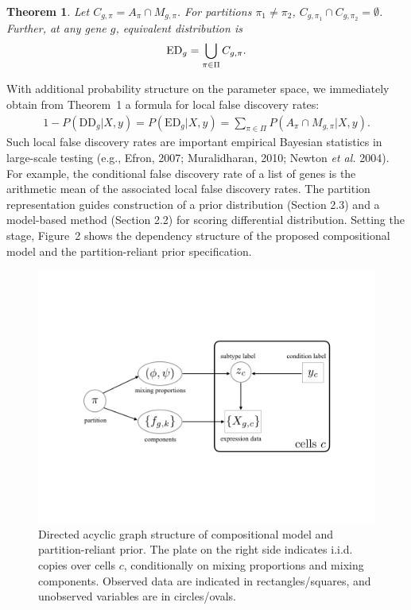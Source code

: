 \documentclass[aoas,preprint]{imsart}
\newtheorem{theorem}{Theorem}
\begin{document}
\begin{theorem}  Let $C_{g,\pi} = A_\pi\cap M_{g, \pi}$.  For 
partitions $\pi_1 \neq\pi_2$, \mbox{$C_{g,\pi_1} \cap C_{g,\pi_2} = \emptyset$}. Further,
 at any gene $g$, equivalent distribution is
\begin{eqnarray*}
{\rm{ED}}_g = \bigcup_{\pi \in \Pi} C_{g,\pi}.
\end{eqnarray*}
\end{theorem}
With additional 
probability structure on the parameter space,  we immediately obtain from Theorem~1 
a formula for local false discovery rates:
\begin{align}
\label{eq:lfdr}
1-P(\text{DD}_g|X,y) = 
 P(\text{ED}_g|X,y) = \sum_{\pi \in \Pi} P\left(A_\pi \cap M_{g,\pi} |X,y \right).
\end{align}
Such local false discovery rates are important empirical Bayesian 
statistics in large-scale testing (e.g., Efron, 2007; Muralidharan, 2010; Newton 
{\em et al.} 2004).  For example, the conditional false discovery rate of a list of genes 
is the arithmetic mean of the associated local false discovery rates.  
The partition representation guides construction of a prior distribution (Section 2.3) and a 
model-based method (Section 2.2) for scoring  differential distribution.   Setting the stage, 
Figure~2 shows the dependency structure of 
the proposed compositional model and the partition-reliant prior specification.

\begin{figure}[h!]
\includegraphics[trim={4cm 6cm 4cm 6cm}, clip, width=5in]{Figs/dag.png}
  \caption{Directed acyclic graph structure of compositional 
model and partition-reliant prior. The plate on the right side indicates i.i.d.
copies over cells $c$, conditionally on mixing proportions and mixing components.
 Observed data are indicated in rectangles/squares, and unobserved variables
are in circles/ovals. }
  \label{fig:2}
\end{figure}
\end{document}
